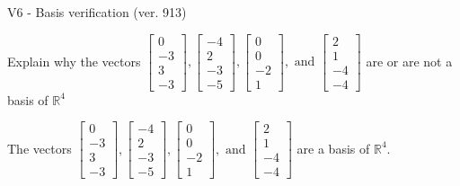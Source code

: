 \begin{exercise}
  \begin{exerciseTitle}V6 - Basis verification (ver. 913)\end{exerciseTitle}
  \begin{exerciseStatement}
    Explain why the vectors \(\left[\begin{array}{r}
0 \\
-3 \\
3 \\
-3
\end{array}\right] , \left[\begin{array}{r}
-4 \\
2 \\
-3 \\
-5
\end{array}\right] , \left[\begin{array}{r}
0 \\
0 \\
-2 \\
1
\end{array}\right] , \text{ and } \left[\begin{array}{r}
2 \\
1 \\
-4 \\
-4
\end{array}\right]\) are or are not a basis of \(\mathbb{R}^4\)	


  \end{exerciseStatement}
  \begin{exerciseAnswer}
   The vectors \(\left[\begin{array}{r}
0 \\
-3 \\
3 \\
-3
\end{array}\right] , \left[\begin{array}{r}
-4 \\
2 \\
-3 \\
-5
\end{array}\right] , \left[\begin{array}{r}
0 \\
0 \\
-2 \\
1
\end{array}\right] , \text{ and } \left[\begin{array}{r}
2 \\
1 \\
-4 \\
-4
\end{array}\right]\) 
  	 are  a basis of \(\mathbb{R}^4\).
  


  \end{exerciseAnswer}
\end{exercise}
